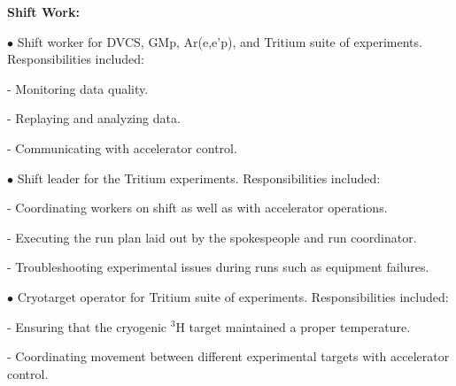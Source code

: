 \documentclass[letterpaper,10pt]{article}
\renewenvironment{itemize}{
  \begin{list}{}{
    \setlength{\leftmargin}{1.5em}
  }
}{
  \end{list}
}
\begin{document}
{\begin{itemize}
\begin{itemize}
     \item \textbf{Shift Work:}
     \begin{itemize}\itemsep5pt \parskip0pt 
      \item $\bullet$ Shift worker for DVCS, GMp, Ar(e,e'p), and Tritium suite of experiments. Responsibilities included: 
      	\begin{itemize}\itemsep2pt
      		\item - Monitoring data quality.
      		\item - Replaying and analyzing data. 
      		\item - Communicating with accelerator control.
      	\end{itemize} 
      \item $\bullet$ Shift leader for the Tritium experiments. Responsibilities included:
		\begin{itemize}\itemsep2pt
			\item - Coordinating workers on shift as well as with accelerator operations.
			\item - Executing the run plan laid out by the spokespeople and run coordinator. 
			\item - Troubleshooting experimental issues during runs such as equipment failures.
		\end{itemize}      
      \item $\bullet$ Cryotarget operator for Tritium suite of experiments. Responsibilities included:
      	\begin{itemize}\itemsep2pt
        		\item - Ensuring that the cryogenic $^{3}$H target maintained a proper temperature.
        		\item - Coordinating movement between different experimental targets with accelerator control.
      	\end{itemize}
     \end{itemize} 
     
 \end{itemize}


\end{itemize}}
\end{document}
